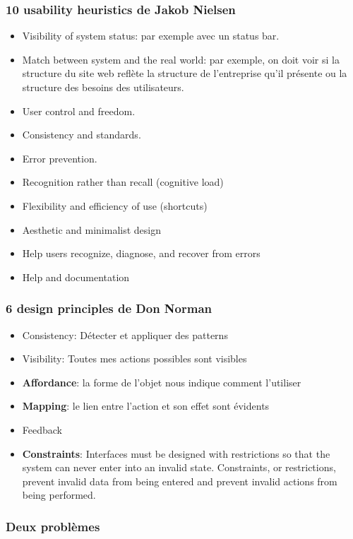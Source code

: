 \subsubsection{10 usability heuristics de Jakob Nielsen}

\begin{itemize}
\item Visibility of system status: par exemple avec un status bar.
\item Match between system and the real world: par exemple, on doit voir si la structure du site web refl\`ete la structure de l'entreprise qu'il pr\'esente ou la structure des besoins des utilisateurs.
\item User control and freedom.
\item Consistency and standards. 
\item Error prevention. 
\item Recognition rather than recall (cognitive load) 
\item Flexibility and efficiency of use (shortcuts)
\item Aesthetic and minimalist design
\item Help users recognize, diagnose, and recover from errors
\item Help and documentation
\end{itemize}

\subsubsection{6 design principles de Don Norman}

\begin{itemize}
\item Consistency: D\'etecter et appliquer des patterns
\item Visibility: Toutes mes actions possibles sont visibles
\item \textbf{Affordance}: la forme de l'objet nous indique comment l'utiliser
\item \textbf{Mapping}: le lien entre l'action et son effet sont \'evidents
\item Feedback
\item \textbf{Constraints}:  Interfaces must be designed with restrictions so that the system can never enter into an invalid state. Constraints, or restrictions, prevent invalid data from being entered and prevent invalid actions from being performed.
\end{itemize}

\subsubsection{Deux probl\`emes}

